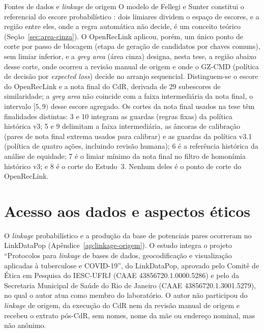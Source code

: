 \begin{chapter}{Fontes de dados e \textit{linkage} de origem}
O modelo de Fellegi e Sunter constitui o referencial do escore probabilístico \cite{Fellegi1969theory}: dois limiares dividem o espaço de escores, e a região entre eles, onde a regra automática não decide, é um conceito teórico (Seção~\ref{sec:area-cinza}). O OpenRecLink aplicou, porém, um único ponto de corte por passo de blocagem (etapa de geração de candidatos por chaves comuns), sem limiar inferior, e a \textit{grey area} (área cinza) designa, nesta tese, a região abaixo desse corte, onde ocorreu a revisão manual de origem e onde o GZ-CMD (política de decisão por \textit{expected loss}) decide no arranjo sequencial. Distinguem-se o escore do OpenRecLink e a nota final do CdR, derivada de 29 subescores de similaridade; a \textit{grey area} não coincide com a faixa intermediária da nota final, o intervalo $[5,9)$ desse escore agregado. Os cortes da nota final usados na tese têm finalidades distintas: 3 e 10 integram as guardas (regras fixas) da política histórica v3; 5 e 9 delimitam a faixa intermediária, as âncoras de calibração (pares de nota final extrema usados para calibrar) e as guardas da política v3.1 (política de quatro ações, incluindo revisão humana); 6 é a referência histórica da análise de equidade; 7 é o limiar mínimo da nota final no filtro de homonímia histórico v3; e 8 é o corte do Estudo~3. Nenhum deles é o ponto de corte do OpenRecLink.

\section{Acesso aos dados e aspectos éticos}\label{sec:dados-acesso-etica}

O \textit{linkage} probabilístico e a produção da base de potenciais pares ocorreram no LinkDataPop (Apêndice~\ref{ap:linkage-origem}). O estudo integra o projeto ``Protocolos para \textit{linkage} de bases de dados, geocodificação e visualização aplicadas à tuberculose e COVID-19'', do LinkDataPop, aprovado pelo Comitê de Ética em Pesquisa do IESC-UFRJ (CAAE 43856720.1.0000.5286) e pelo da Secretaria Municipal de Saúde do Rio de Janeiro (CAAE 43856720.1.3001.5279), no qual o autor atua como membro do laboratório. O autor não participou do \textit{linkage} de origem, da execução do CdR nem da revisão manual de origem e recebeu o extrato pós-CdR, sem nomes, nome da mãe ou endereço nominal, mas não anônimo.


\end{chapter}
